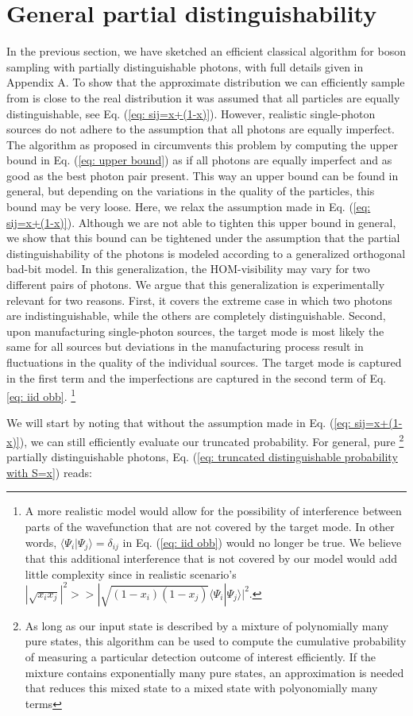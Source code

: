 \documentclass[10pt,aps,pra,twocolumn,superscriptaddress]{revtex4-2}
\begin{document}
\section{General partial distinguishability}
\label{sec: general part dist}
In the previous section, we have sketched an efficient classical algorithm for boson sampling with partially distinguishable photons, with full details given in Appendix A. To show that the approximate distribution we can efficiently sample from is close to the real distribution it was assumed that all particles are equally distinguishable, see Eq. (\ref{eq: sij=x+(1-x)}). 
However, realistic single-photon sources do not adhere to the assumption that all photons are equally imperfect. The algorithm as proposed in \cite{renema2018efficient} circumvents this problem by computing the upper bound in Eq. (\ref{eq: upper bound}) as if all photons are equally imperfect and
as good as the best photon pair present. This way an upper bound can be found in general, but depending on the variations in the quality of the particles, this bound may be very loose.
Here, we relax the assumption made in Eq. (\ref{eq: sij=x+(1-x)}).
Although we are not able to tighten this upper bound in general, we show that this bound can be tightened under the assumption that the partial distinguishability of the photons is modeled according to a generalized orthogonal bad-bit model. In this generalization, the HOM-visibility may vary for two different pairs of photons. We argue that this generalization is experimentally relevant for two reasons. First, it covers the extreme case in which two photons are indistinguishable, while the others are completely distinguishable. 
Second, upon manufacturing single-photon sources, the target mode is most likely the same for all sources but deviations in the manufacturing process result in fluctuations in the quality of the individual sources. The target mode is captured in the first term and the imperfections are captured in the second term of Eq. \ref{eq: iid obb}.
\footnote{A more realistic model would allow for the possibility of interference between parts of the wavefunction that are not covered by the target mode. In other words, $\langle\Psi_i|\Psi_j\rangle=\delta_{ij}$ in Eq. (\ref{eq: iid obb}) would no longer be true. We believe that this additional interference that is not covered by our model would add little complexity since in realistic scenario's $|\sqrt{x_i x_j}|^2>>|\sqrt{(1-x_i)(1-x_j)}\langle\Psi_i|\Psi_j\rangle|^2$.}

We will start by noting that without the assumption made in Eq. (\ref{eq: sij=x+(1-x)}), we can still efficiently evaluate our truncated probability. For general, pure \footnote{As long as our input state is described by a mixture of polynomially many pure states, this algorithm can be used to compute the cumulative probability of measuring a particular detection outcome of interest efficiently. If the mixture contains exponentially many pure states, an approximation is needed that reduces this mixed state to a mixed state with polyonomially many terms} partially distinguishable photons, Eq. (\ref{eq: truncated distinguishable probability with S=x}) reads:
\end{document}
